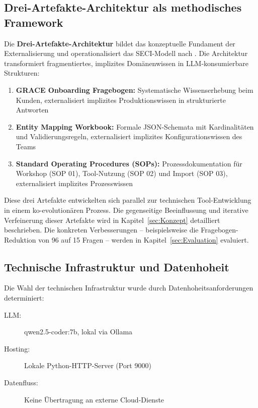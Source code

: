 \subsection{Drei-Artefakte-Architektur als methodisches Framework}
\label{subsec:DreiArtefakteArchitektur}

Die \textbf{Drei-Artefakte-Architektur} bildet das konzeptuelle Fundament der Externalisierung und operationalisiert das SECI-Modell nach \cite{nonaka:knowledge_creating_company1995}. Die Architektur transformiert fragmentiertes, implizites Domänenwissen in LLM-konsumierbare Strukturen:

\begin{enumerate}
    \item \textbf{GRACE Onboarding Fragebogen:} Systematische Wissenserhebung beim Kunden, externalisiert implizites Produktionswissen in strukturierte Antworten

    \item \textbf{Entity Mapping Workbook:} Formale JSON-Schemata mit Kardinalitäten und Validierungsregeln, externalisiert implizites Konfigurationswissen des Teams

    \item \textbf{Standard Operating Procedures (SOPs):} Prozessdokumentation für Workshop (SOP 01), Tool-Nutzung (SOP 02) und Import (SOP 03), externalisiert implizites Prozesswissen
\end{enumerate}

Diese drei Artefakte entwickelten sich parallel zur technischen Tool-Entwicklung in einem ko-evolutionären Prozess. Die gegenseitige Beeinflussung und iterative Verfeinerung dieser Artefakte wird in Kapitel~\ref{sec:Konzept} detailliert beschrieben. Die konkreten Verbesserungen -- beispielsweise die Fragebogen-Reduktion von 96 auf 15 Fragen -- werden in Kapitel~\ref{sec:Evaluation} evaluiert.


\subsection{Technische Infrastruktur und Datenhoheit}
\label{subsec:TechnischeInfrastruktur}

Die Wahl der technischen Infrastruktur wurde durch Datenhoheitsanforderungen determiniert:

\begin{description}
    \item[LLM:] qwen2.5-coder:7b, lokal via Ollama
    \item[Hosting:] Lokale Python-HTTP-Server (Port 9000)
    \item[Datenfluss:] Keine Übertragung an externe Cloud-Dienste
\end{description}

